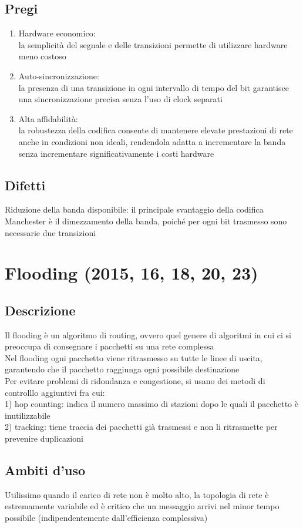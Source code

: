 \documentclass[10pt,oneside,a4paper]{article}
\begin{document}
\subsection{Pregi}
\begin{enumerate}
\item Hardware economico:\\
la semplicità del segnale e delle transizioni permette di utilizzare hardware meno costoso
\item Auto-sincronizzazione:\\
la presenza di una transizione in ogni intervallo di tempo del bit garantisce una sincronizzazione precisa senza l'uso di clock separati
\item Alta affidabilità:\\
la robustezza della codifica consente di mantenere elevate prestazioni di rete anche in condizioni non ideali, rendendola adatta a incrementare la banda senza incrementare significativamente i costi hardware
\end{enumerate}
\subsection{Difetti}
Riduzione della banda disponibile: il principale svantaggio della codifica Manchester è il dimezzamento della banda, poiché per ogni bit trasmesso sono necessarie due transizioni
\section{Flooding (2015, 16, 18, 20, 23)}
\subsection{Descrizione}
Il flooding è un algoritmo di routing, ovvero quel genere di algoritmi in cui ci si preoccupa di consegnare i pacchetti su una rete complessa\\
Nel flooding ogni pacchetto viene ritrasmesso su tutte le linee di uscita, garantendo che il pacchetto raggiunga ogni possibile destinazione\\
Per evitare problemi di ridondanza e congestione, si usano dei metodi di controlllo aggiuntivi fra cui:\\
1) hop counting: indica il numero massimo di stazioni dopo le quali il pacchetto è inutilizzabile\\
2) tracking: tiene traccia dei pacchetti già trasmessi e non li ritrasmette per prevenire duplicazioni
\subsection{Ambiti d'uso}
Utilissimo quando il carico di rete non è molto alto, la topologia di rete è estremamente variabile ed è critico che un messaggio arrivi nel minor tempo possibile (indipendentemente dall'efficienza complessiva)
\end{document}
